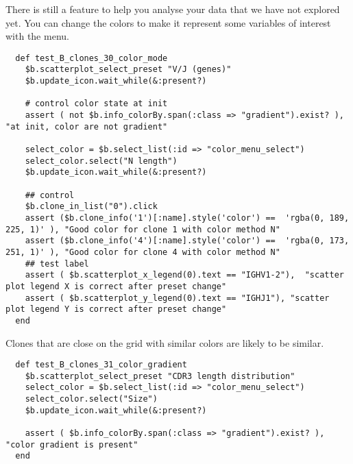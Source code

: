 There is still a feature to help you analyse your data that we have not
explored yet.
You can change the colors to make it represent some variables of interest
with the  menu.
\begin{verbatim}
  def test_B_clones_30_color_mode
    $b.scatterplot_select_preset "V/J (genes)"
    $b.update_icon.wait_while(&:present?)

    # control color state at init
    assert ( not $b.info_colorBy.span(:class => "gradient").exist? ), "at init, color are not gradient"

    select_color = $b.select_list(:id => "color_menu_select")
    select_color.select("N length")
    $b.update_icon.wait_while(&:present?)
    
    ## control
    $b.clone_in_list("0").click
    assert ($b.clone_info('1')[:name].style('color') ==  'rgba(0, 189, 225, 1)' ), "Good color for clone 1 with color method N"
    assert ($b.clone_info('4')[:name].style('color') ==  'rgba(0, 173, 251, 1)' ), "Good color for clone 4 with color method N"
    ## test label
    assert ( $b.scatterplot_x_legend(0).text == "IGHV1-2"),  "scatter plot legend X is correct after preset change"
    assert ( $b.scatterplot_y_legend(0).text == "IGHJ1"), "scatter plot legend Y is correct after preset change"
  end
\end{verbatim}
  
Clones that are close on the grid with similar colors are likely to
be similar.

\begin{verbatim}
  def test_B_clones_31_color_gradient
    $b.scatterplot_select_preset "CDR3 length distribution"
    select_color = $b.select_list(:id => "color_menu_select")
    select_color.select("Size")
    $b.update_icon.wait_while(&:present?)

    assert ( $b.info_colorBy.span(:class => "gradient").exist? ), "color gradient is present"
  end
\end{verbatim}

